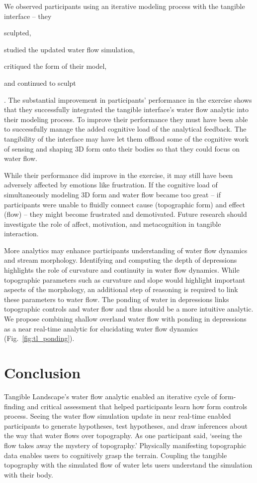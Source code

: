 \documentclass{isprs}
\begin{document}
We observed participants using an iterative modeling process with the tangible interface -- 
they 
\begin{enumerate*}[label=\alph*),font=\itshape]
\item sculpted, 
\item studied the updated water flow simulation, 
\item critiqued the form of their model, 
\item and continued to sculpt
\end{enumerate*}.
%
The substantial improvement in participants' performance in the  exercise
shows that they successfully integrated the tangible interface's water flow analytic 
into their modeling process. 
%
To improve their performance they must have been able to successfully manage the added cognitive load of the analytical feedback. 
%
The tangibility of the interface may have let them offload some of the cognitive work of sensing and shaping 3D form onto their bodies
so that they could focus on water flow. 

While their performance did improve in the  exercise, it may still have been adversely affected by emotions like frustration. 
%
If the cognitive load of simultaneously modeling 3D form and water flow became too great
-- if participants were unable to fluidly connect cause (topographic form) and effect (flow) --
they might become frustrated and demotivated. 
%
Future research should investigate the role of affect, motivation, and metacognition in tangible interaction.

More analytics may enhance participants understanding of water flow dynamics and stream morphology. 
%
Identifying and computing the depth of depressions highlights the role of curvature and continuity in water flow dynamics. 
%
While topographic parameters such as curvature and slope would highlight important aspects of the morphology, 
an additional step of reasoning is required to link these parameters to water flow. 
%
The ponding of water in depressions links topographic controls and water flow 
and thus should be a more intuitive analytic. 
%
We propose combining shallow overland water flow with ponding in depressions
as a near real-time analytic
for elucidating water flow dynamics (Fig.~\ref{fig:tl_ponding}). 

\section{Conclusion}\label{sec:conclusion}
%
Tangible Landscape's water flow analytic enabled an iterative cycle of form-finding and critical assessment that helped participants learn how form controls process. 
%
Seeing the water flow simulation update in near real-time 
enabled participants to generate hypotheses, test hypotheses, and draw inferences 
about the way that water flows over topography. 
%
As one participant said, `seeing the flow takes away the mystery of topography.' 
%
Physically manifesting topographic data enables users to cognitively grasp the terrain. 
Coupling the tangible topography with the simulated flow of water 
lets users understand the simulation with their body. 
\end{document}
